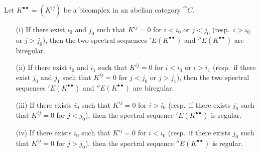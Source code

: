 \begin{proposition}[11.3.3]
\label{0.11.3.3}
Let $K^{\bullet\bullet}=(K^{ij})$ be a bicomplex in an abelian category $\cat{C}$.
\begin{enumerate}
  \item[{\rm(i)}] If there exist $i_0$ and $j_0$ such that $K^{ij}=0$ for $i<i_0$ or $j<j_0$ (resp.~$i>i_0$ or $j>j_0$), then the two spectral sequences $'E(K^{\bullet\bullet})$ and $''E(K^{\bullet\bullet})$ are biregular.
  \item[{\rm(ii)}] If there exist $i_0$ and $i_1$ such that $K^{ij}=0$ for $i<i_0$ or $i>i_1$ (resp.~if there exist $j_0$ and $j_1$ such that $K^{ij}=0$ for $j<j_0$ or $j>j_1$), then the two spectral sequences $'E(K^{\bullet\bullet})$ and $''E(K^{\bullet\bullet})$ are biregular.
  \item[{\rm(iii)}] If there exists $i_0$ such that $K^{ij}=0$ for $i>i_0$ (resp.~if there exists $j_0$ such that $K^{ij}=0$ for $j<j_0$), then the spectral sequence $'E(K^{\bullet\bullet})$ is regular.
  \item[{\rm(iv)}] If there exists $i_0$ such that $K^{ij}=0$ for $i<i_0$ (resp.~if there exists $j_0$ such that $K^{ij}=0$ for $j>j_0$), then the spectral sequence $''E(K^{\bullet\bullet})$ is regular.
\end{enumerate}
\end{proposition}

